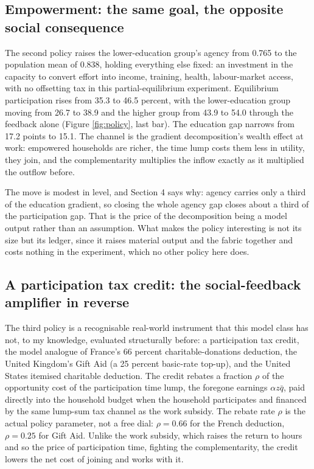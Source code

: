 \documentclass[11pt]{article}
\begin{document}
\subsection{Empowerment: the same goal, the opposite social consequence}

The second policy raises the lower-education group's agency from 0.765 to the population mean of 0.838, holding everything else fixed: an investment in the capacity to convert effort into income, training, health, labour-market access, with no offsetting tax in this partial-equilibrium experiment. Equilibrium participation rises from 35.3 to 46.5 percent, with the lower-education group moving from 26.7 to 38.9 and the higher group from 43.9 to 54.0 through the feedback alone (Figure \ref{fig:policy}, last bar). The education gap narrows from 17.2 points to 15.1. The channel is the gradient decomposition's wealth effect at work: empowered households are richer, the time lump costs them less in utility, they join, and the complementarity multiplies the inflow exactly as it multiplied the outflow before.

The move is modest in level, and Section 4 says why: agency carries only a third of the education gradient, so closing the whole agency gap closes about a third of the participation gap. That is the price of the decomposition being a model output rather than an assumption. What makes the policy interesting is not its size but its ledger, since it raises material output and the fabric together and costs nothing in the experiment, which no other policy here does.

\subsection{A participation tax credit: the social-feedback amplifier in reverse}

The third policy is a recognisable real-world instrument that this model class has not, to my knowledge, evaluated structurally before: a participation tax credit, the model analogue of France's 66 percent charitable-donations deduction, the United Kingdom's Gift Aid (a 25 percent basic-rate top-up), and the United States itemised charitable deduction. The credit rebates a fraction $\rho$ of the opportunity cost of the participation time lump, the foregone earnings $\alpha z \bar q$, paid directly into the household budget when the household participates and financed by the same lump-sum tax channel as the work subsidy. The rebate rate $\rho$ is the actual policy parameter, not a free dial: $\rho = 0.66$ for the French deduction, $\rho = 0.25$ for Gift Aid. Unlike the work subsidy, which raises the return to hours and so the price of participation time, fighting the complementarity, the credit lowers the net cost of joining and works with it.
\end{document}
